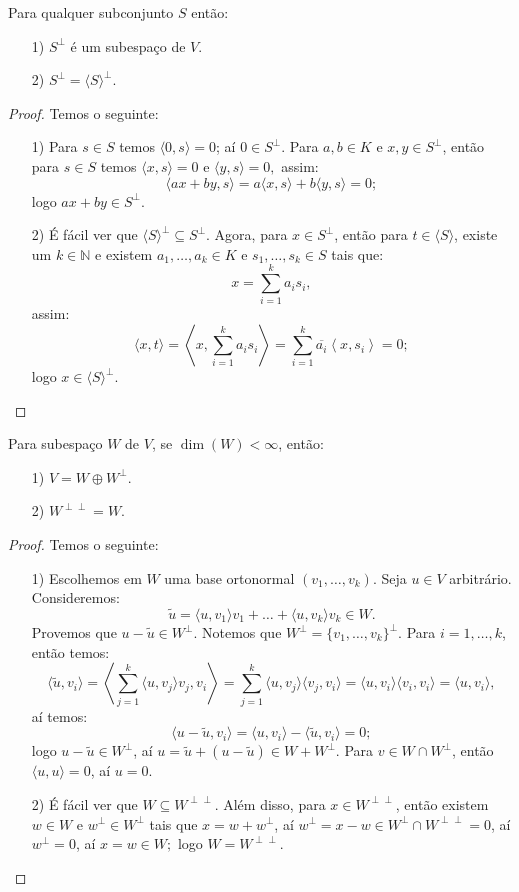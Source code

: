 \documentclass[11pt,twoside,a4paper]{book}
\begin{document}
\begin{proposicao}
Para qualquer subconjunto $S$ então:
\begin{itemize}
\item[1)] $S^\perp$ é um subespaço de $V.$
\item[2)] $S^\perp=\langle S\rangle^\perp.$
\end{itemize}
\end{proposicao}
\begin{proof}
Temos o seguinte:
\begin{itemize}
\item[1)] Para $s\in S$ temos $\langle 0,s\rangle=0$; aí $0\in S^\perp$. Para $a,b\in K$ e $x,y\in S^\perp$, então para $s\in S$ temos $\langle x,s\rangle=0$ e $\langle y,s\rangle=0,$ assim:
\[
\langle ax+by,s\rangle=a\langle x,s\rangle+b\langle y,s\rangle=0;
\]
logo $ax+by\in S^\perp.$
\item[2)] É fácil ver que $\langle S\rangle^\perp\subseteq S^\perp.$ Agora, para $x\in S^\perp$, então para $t\in \langle S\rangle$, existe um $k\in\mathbb{N}$ e existem $a_1,\dots,a_k\in K$ e $s_1,\dots,s_k\in S$ tais que:
\[
x=\sum_{i=1}^ka_is_i,
\]
assim:
\[
\langle x,t\rangle=\left\langle x,\sum_{i=1}^ka_is_i\right\rangle=\sum_{i=1}^k\overline{a_i}\left\langle x,s_i\right\rangle=0;
\]
logo $x\in\langle S\rangle^\perp.$
\end{itemize}
\end{proof}

\begin{proposicao}\label{proj1}
Para subespaço $W$ de $V$, se $\dim(W)<\infty$, então:
\begin{itemize}
\item[1)] $V=W\oplus W^\perp$.
\item[2)] $W^{\perp\perp}=W$.
\end{itemize}
\end{proposicao}
\begin{proof}
Temos o seguinte:
\begin{itemize}
\item[1)] Escolhemos em $W$ uma base ortonormal $(v_1,\dots,v_k)$. Seja $u\in V$ arbitrário. Consideremos:
\[
\tilde{u}=\langle u,v_1\rangle v_1+\dots+\langle u,v_k\rangle v_k\in W.
\]
Provemos que $u-\tilde{u}\in W^\perp$. Notemos que $W^\perp=\{v_1,\dots,v_k\}^\perp$. Para $i=1,\dots,k$, então temos:
\[
\langle \tilde{u},v_i\rangle=\left\langle\sum_{j=1}^k\langle u,v_j\rangle v_j,v_i\right\rangle
=\sum_{j=1}^k\langle u,v_j\rangle\langle v_j,v_i\rangle
=\langle u,v_i\rangle\langle v_i,v_i\rangle
=\langle u,v_i\rangle,
\]
aí temos:
\[
\langle u-\tilde{u},v_i\rangle=\langle u,v_i\rangle-\langle \tilde{u},v_i\rangle=0;
\]
logo $u-\tilde{u}\in W^\perp$, aí $u=\tilde{u}+(u-\tilde{u})\in W+W^\perp$. Para $v\in W\cap W^\perp$, então $\langle u,u\rangle=0$, aí $u=0$.
\item[2)] É fácil ver que $W\subseteq W^{\perp\perp}$. Além disso, para $x\in W^{\perp\perp}$, então existem $w\in W$ e $w^\perp\in W^\perp$ tais que $x=w+w^\perp$, aí $w^\perp=x-w\in W^\perp\cap W^{\perp\perp}=0$, aí $w^\perp=0$, aí $x=w\in W;$ logo $W=W^{\perp\perp}$.
\end{itemize}
\end{proof}
\end{document}
